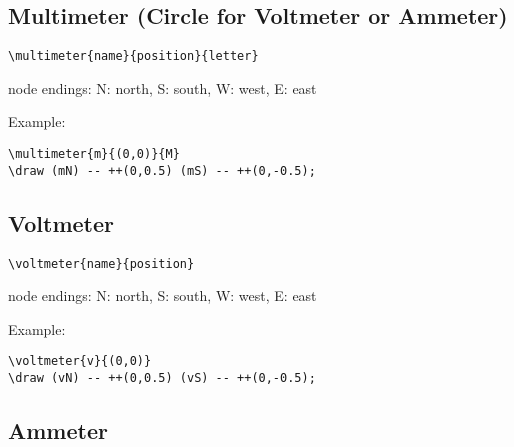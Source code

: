 \documentclass[parskip=full]{scrartcl}
\begin{document}
\subsection{Multimeter (Circle for Voltmeter or Ammeter)}

\begin{verbatim}
\multimeter{name}{position}{letter}
\end{verbatim}
node endings: N: north, S: south, W: west, E: east

Example:\\
\begin{minipage}{0.8\textwidth}
\begin{verbatim}
\multimeter{m}{(0,0)}{M}
\draw (mN) -- ++(0,0.5) (mS) -- ++(0,-0.5);
\end{verbatim}
\end{minipage}
\begin{minipage}{0.19\textwidth}
\end{minipage}

\subsection{Voltmeter}

\begin{verbatim}
\voltmeter{name}{position}
\end{verbatim}
node endings: N: north, S: south, W: west, E: east

Example:\\
\begin{minipage}{0.8\textwidth}
\begin{verbatim}
\voltmeter{v}{(0,0)}
\draw (vN) -- ++(0,0.5) (vS) -- ++(0,-0.5);
\end{verbatim}
\end{minipage}
\begin{minipage}{0.19\textwidth}
\end{minipage}

\subsection{Ammeter}
\end{document}
